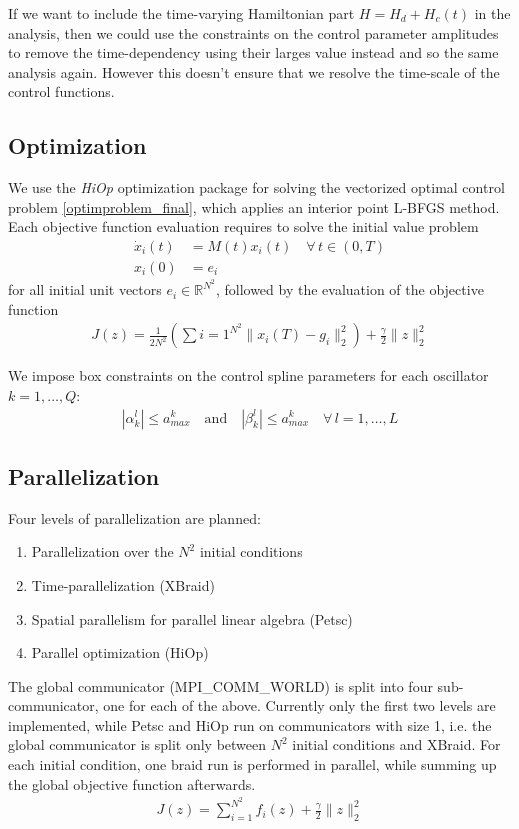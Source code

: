 \documentclass[letterpaper]{article}
\newcommand{\R}{\mathds{R}}
\begin{document}
       If we want to include the time-varying Hamiltonian part $H = H_d + H_c(t)$ in the analysis, then we could use the constraints on the control parameter amplitudes to remove the time-dependency using their larges value instead and so the same analysis again. However this doesn't ensure that we resolve the time-scale of the control functions. 

  \subsection{Optimization}
    We use the \textit{HiOp} optimization package for solving the vectorized optimal control problem \eqref{optimproblem_final}, which applies an interior point L-BFGS method. Each objective function evaluation requires to solve the initial value problem  
        \begin{align*}
          \dot x_i(t) &= M(t) x_i(t) \quad \forall \, t\in (0,T) \\
          x_i(0) &= e_i
        \end{align*}
        for all initial unit vectors $e_i \in \R^{N^2}$, followed by the evaluation of the objective function 
        \begin{align}
          J(z) = \frac{1}{2N^2} \left(\sum {i=1}^{N^2} \|x_i(T) - g_i\|^2_2  \right) + \frac{\gamma}{2} \| z\|^2_2
        \end{align}

    We impose box constraints on the control spline parameters for each oscillator $k=1,\dots, Q$:
        \begin{align}
          | \alpha^l_k| \leq a_{max}^k \quad \text{and} \quad | \beta^l_k|  \leq a_{max}^k \quad \forall \, l=1,\dots, L 
        \end{align}


  \subsection{Parallelization}
    Four levels of parallelization are planned: 
      \begin{enumerate}
        \item Parallelization over the $N^2$ initial conditions
        \item Time-parallelization (XBraid)
        \item Spatial parallelism for parallel linear algebra (Petsc)
        \item Parallel optimization (HiOp)
      \end{enumerate}
      The global communicator (MPI\_COMM\_WORLD) is split into four sub-communicator, one for each of the above. Currently only the first two levels are implemented, while Petsc and HiOp run on communicators with size 1, i.e. the global communicator is split only between $N^2$ initial conditions and XBraid. For each initial condition, one braid run is performed in parallel, while summing up the global objective function afterwards.
      \begin{align*}
        J(z) = \sum_{i=1}^{N^2} f_i(z) + \frac{\gamma}{2}\| z\|^2_2
      \end{align*}
      
\end{document}
